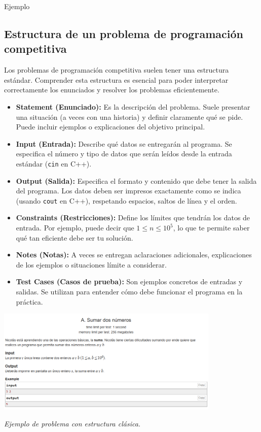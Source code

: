 \documentclass{article}
\newcommand{\cppfile}[2][]{
    \begin{container}{\faCode \space \space  #1}
        
    \end{container}
}
\begin{document}
\cppfile[Ejemplo]{codes/variables4.cpp}


\subsection{Estructura de un problema de programación competitiva}

Los problemas de programación competitiva suelen tener una estructura estándar. Comprender esta estructura es esencial para poder interpretar correctamente los enunciados y resolver los problemas eficientemente.

\begin{itemize}
    \item \textbf{Statement (Enunciado):} Es la descripción del problema. Suele presentar una situación (a veces con una historia) y definir claramente qué se pide. Puede incluir ejemplos o explicaciones del objetivo principal.
    
    \item \textbf{Input (Entrada):} Describe qué datos se entregarán al programa. Se especifica el número y tipo de datos que serán leídos desde la entrada estándar (\texttt{cin} en C++).

    \item \textbf{Output (Salida):} Especifica el formato y contenido que debe tener la salida del programa. Los datos deben ser impresos exactamente como se indica (usando \texttt{cout} en C++), respetando espacios, saltos de línea y el orden.

    \item \textbf{Constraints (Restricciones):} Define los límites que tendrán los datos de entrada. Por ejemplo, puede decir que $1 \leq n \leq 10^5$, lo que te permite saber qué tan eficiente debe ser tu solución.

    \item \textbf{Notes (Notas):} A veces se entregan aclaraciones adicionales, explicaciones de los ejemplos o situaciones límite a considerar.

    \item \textbf{Test Cases (Casos de prueba):} Son ejemplos concretos de entradas y salidas. Se utilizan para entender cómo debe funcionar el programa en la práctica.
\end{itemize}

\vspace{0.5cm}

\begin{center}
    \includegraphics[width=0.8\textwidth]{img/statementexample.png}
    
    \textit{Ejemplo de problema con estructura clásica.}
\end{center}
\end{document}
